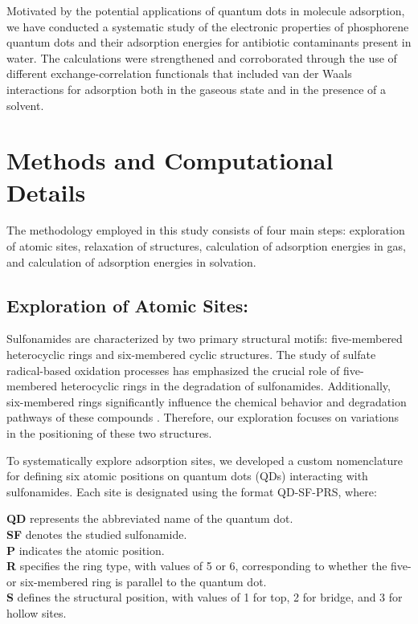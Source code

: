 \documentclass[preprint,12pt]{elsarticle}
\begin{document}
	Motivated by the potential applications of quantum dots in molecule adsorption, we have conducted a systematic study of the electronic properties of phosphorene quantum dots and their adsorption energies for antibiotic contaminants present in water. The calculations were strengthened and corroborated through the use of different exchange-correlation functionals that included van der Waals interactions for adsorption both in the gaseous state and in the presence of a solvent.
	
	\section{Methods and Computational Details}
	
	The methodology employed in this study consists of four main steps: exploration of atomic sites, relaxation of structures, calculation of adsorption energies in gas, and calculation of adsorption energies in solvation.
	
	\subsection{Exploration of Atomic Sites:} Sulfonamides are characterized by two primary structural motifs: five-membered heterocyclic rings and six-membered cyclic structures. The study of sulfate radical-based oxidation processes has emphasized the crucial role of five-membered heterocyclic rings in the degradation of sulfonamides. Additionally, six-membered rings significantly influence the chemical behavior and degradation pathways of these compounds \cite{Zhou2019Sulfate}. Therefore, our exploration focuses on variations in the positioning of these two structures.
	
	To systematically explore adsorption sites, we developed a custom nomenclature for defining six atomic positions on quantum dots (QDs) interacting with sulfonamides. Each site is designated using the format QD-SF-PRS, where:
	
	\textbf{QD} represents the abbreviated name of the quantum dot.\\  
	\textbf{SF} denotes the studied sulfonamide.\\
	\textbf{P} indicates the atomic position.\\
	\textbf{R} specifies the ring type, with values of 5 or 6, corresponding to whether the five- or six-membered ring is parallel to the quantum dot.\\  
	\textbf{S} defines the structural position, with values of 1 for top, 2 for bridge, and 3 for hollow sites.  
	
\end{document}
